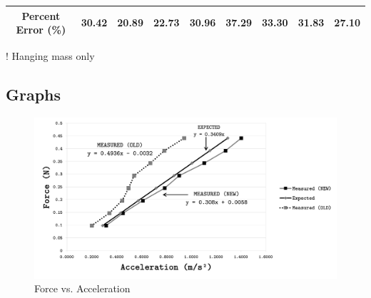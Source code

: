 \begin{landscape}
\begin{table}[H]
\begin{threeparttable}
{\begin{tabular}{ccccccccc}
\textbf{Percent Error (\%)}                                                    & \textbf{30.42} & \textbf{20.89}  & \textbf{22.73} & \textbf{30.96} & \textbf{37.29} & \textbf{33.30} & \textbf{31.83} & \textbf{27.10}  \\ \bottomrule
\end{tabular}%
}
\begin{tablenotes}\normalsize
	\item[!] Hanging mass only 
\end{tablenotes}
\end{threeparttable}
\label{tab:dataTabOld}
\end{table}

\begin{table}[H]
\centering
\captionsetup{font=Large}
\caption{Measured Acceleration - Fractional Discrepancy of Slope (Mass)}
\label{tab:slopeTab}
\end{table}
\end{landscape}
 


\begin{landscape}
\subsection{Graphs}
\begin{figure}[H]
	\begin{center}
		\captionsetup{font=Large}
		\caption{Force vs. Acceleration}\label{fig:GFvA}
		\includegraphics[width=0.90\columnwidth]{images/GraphFvA}
	\end{center}
\end{figure}
\end{landscape}


\newpage


